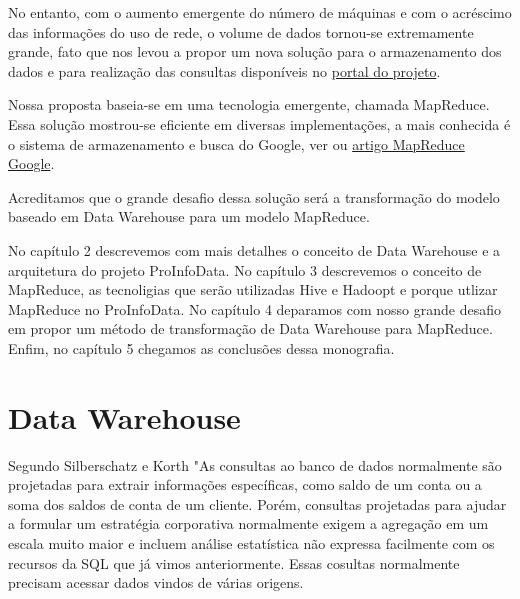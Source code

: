 \documentclass[a4paper,12pt]{article}
\begin{document}
No entanto, com o aumento emergente do número de máquinas e com o acréscimo das
informações do uso de rede, o volume de dados tornou-se extremamente grande, fato que 
nos levou a propor um nova solução para o armazenamento dos dados e para realização
das consultas disponíveis no \href {http://seed.c3sl.ufpr.br/seed/attendance/index.html}
{portal do projeto}.

Nossa proposta baseia-se em uma tecnologia emergente, chamada MapReduce. Essa solução 
mostrou-se eficiente em diversas implementações, a mais conhecida é o sistema de 
armazenamento e busca do Google, ver \cite{MapReduceGoogle} ou
\href {http://labs.google.com/papers/mapreduce.html} {artigo MapReduce Google}.

Acreditamos que o grande desafio dessa solução será a transformação do modelo baseado 
em Data Warehouse para um modelo MapReduce.

No capítulo 2 descrevemos com mais detalhes o conceito de Data Warehouse e a arquitetura
do projeto ProInfoData. No capítulo 3 descrevemos o conceito de MapReduce, as 
tecnoligias que serão utilizadas Hive e Hadoopt e porque utlizar MapReduce no 
ProInfoData. No capítulo 4 deparamos com nosso grande desafio em propor um método de 
transformação de Data Warehouse para MapReduce. Enfim, no capítulo 5 chegamos as
conclusões dessa monografia.

\section{\textbf{Data Warehouse}}

Segundo Silberschatz e Korth \cite{Silber} "As consultas ao banco de dados
normalmente são projetadas para extrair informações específicas, como saldo
de um conta ou a soma dos saldos de conta de um cliente. Porém, consultas
projetadas para ajudar a formular um estratégia corporativa normalmente
exigem a agregação em um escala muito maior e incluem análise estatística
não expressa facilmente com os recursos da SQL que já vimos anteriormente.
Essas cosultas normalmente precisam acessar dados vindos de várias origens.

\end{document}
